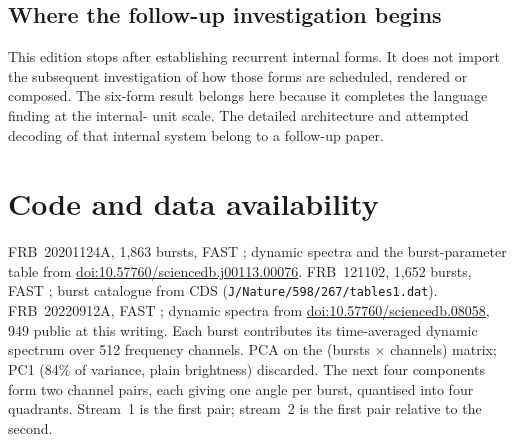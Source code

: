 \documentclass[11pt,a4paper]{article}
\providecommand{\doi}[1]{\href{https://doi.org/#1}{doi:#1}}
\begin{document}
\subsection{Where the follow-up investigation begins}

This edition stops after establishing recurrent internal forms. It does not import the
subsequent investigation of how those forms are scheduled, rendered or composed. The
six-form result belongs here because it completes the language finding at the internal-
unit scale. The detailed architecture and attempted decoding of that internal system
belong to a follow-up paper.

\section*{Code and data availability}

FRB~20201124A, 1{,}863 bursts, FAST \cite{wang2023}; dynamic spectra and the
burst-parameter table from \doi{10.57760/sciencedb.j00113.00076}. FRB~121102, 1{,}652
bursts, FAST \cite{li2021}; burst catalogue from CDS
(\texttt{J/Nature/598/267/tables1.dat}). FRB~20220912A, FAST \cite{zhang2023}; dynamic
spectra from \doi{10.57760/sciencedb.08058}, 949 public at this writing. Each burst
contributes its time-averaged dynamic spectrum over 512 frequency channels. PCA on the (bursts $\times$ channels) matrix; PC1 (84\% of variance,
plain brightness) discarded. The next four components form two channel pairs, each
giving one angle per burst, quantised into four quadrants. Stream~1 is the first pair;
stream~2 is the first pair relative to the second.
\end{document}
